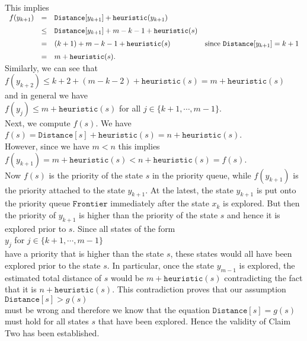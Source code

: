 This implies
\\[0.2cm]
\hspace*{1.3cm}
$
\begin{array}[t]{lcll} 
f(y_{k+1}) & =  & \texttt{Distance}[y_{k+1}] + \texttt{heuristic}(y_{k+1})     \\[0.2cm]
          &\leq& \texttt{Distance}[y_{k+1}] + m-k-1 + \texttt{heuristic}(s) \\[0.2cm]
          & =  & (k+1) + m-k-1 + \texttt{heuristic}(s) 
               & \mbox{since $\texttt{Distance}[y_{k+1}] = k+1$} \\[0.2cm]
          & =  & m + \texttt{heuristic}(s). 
\end{array}
$
\\[0.2cm]
Similarly, we can see that 
\\[0.2cm]
\hspace*{1.3cm}
$f(y_{k+2}) \leq k+2 + (m-k-2) + \texttt{heuristic}(s) = m + \texttt{heuristic}(s)$
\\[0.2cm]
and in general we have
\\[0.2cm]
\hspace*{1.3cm}
$f(y_{j}) \leq m + \texttt{heuristic}(s)$ \quad for all $j \in \{k+1,\cdots,m-1\}$.
\\[0.2cm]
Next, we compute $f(s)$.  We have
\\[0.2cm]
\hspace*{1.3cm}
$f(s) = \texttt{Distance}[s] + \texttt{heuristic}(s) = n + \texttt{heuristic}(s)$.
\\[0.2cm]
However, since we have $m < n$ this implies
\\[0.2cm]
\hspace*{1.3cm}
$f(y_{k+1}) = m + \texttt{heuristic}(s) < n + \mathtt{heuristic}(s) = f(s)$.
\\[0.2cm]
Now $f(s)$ is the priority of the state $s$ in the priority queue, while $f(y_{k+1})$ is the priority
attached to the state $y_{k+1}$.  At the latest,  the state $y_{k+1}$ is put onto the priority queue $\texttt{Frontier}$
immediately after the state $x_k$ is explored.  But then the priority of $y_{k+1}$ is higher than the priority
of the state $s$ and hence it is explored prior to $s$.  Since all states of the form
\\[0.2cm]
\hspace*{1.3cm}
$y_j$ \quad for $j \in \{k+1, \cdots, m-1\}$
\\[0.2cm]
have a priority that is higher than the state $s$, these states would all have been explored prior to the state
$s$.  In particular, once the state $y_{m-1}$ is explored, the estimated total distance of $s$ would be
 $m + \texttt{heuristic}(s)$ contradicting the fact that it is $n + \texttt{heuristic}(s)$.
This contradiction proves that our assumption 
\\[0.2cm]
\hspace*{1.3cm}
 $\texttt{Distance}[s] > g(s)$
\\[0.2cm]
must be wrong and therefore we know that the equation $\texttt{Distance}[s] = g(s)$ must hold for all states
$s$ that have been explored.   Hence the validity of Claim Two has been established.  \green{$\surd$} 
\vspace*{0.2cm}



